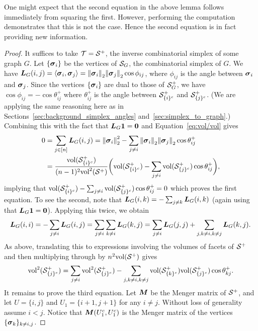 \begin{remark}
	One might expect that the second equation in the above lemma follows immediately from squaring the first. However, performing the computation demonstrates that this is not the case. Hence the second equation is in  fact providing new information. 
\end{remark}
\begin{proof}
	It suffices to take $\mathcal{T}=\mathcal{S}^+$, the  inverse combinatorial simplex of some graph $G$.  Let $\{\vb*{\sigma}_i\}$ be the vertices of $\mathcal{S}_G$, the combinatorial simplex of $G$. 	
	We have $\vb*{L}_G(i,j)=\langle\vb*{\sigma}_i,\vb*{\sigma}_j\rangle = \norm{\vb*{\sigma}_i}_2\norm{\vb*{\sigma}_j}_2\cos\phi_{ij}$, where $\phi_{ij}$ is the angle between $\vb*{\sigma}_i$ and $\vb*{\sigma}_j$. Since the vertices $\{\vb*{\sigma}_i\}$ are  dual to those of $\mathcal{S}^+_G$, we have $\cos\phi_{ij}=-\cos\theta^+_{ij}$ where $\theta^+_{ij}$ is the angle between $\mathcal{S}^+_{\{i\}^c}$ and $\mathcal{S}^+_{\{j\}^c}$. (We are applying the same reasoning here as in Sections~\ref{sec:background_simplex_angles} and~\ref{sec:simplex_to_graph}.) Combining this with the fact that $\vb*{L}_G\vb{1}=\vb{0}$ and Equation~\eqref{eq:vol/vol} gives
	\begin{align*}
	0 &= \sum_{j\in[n]} \vb*{L}_G(i,j) = \norm{\vb*{\sigma}_i}_2^2 - \sum_{j\neq i}\norm{\vb*{\sigma}_i}_2\norm{\vb*{\sigma}_j}_2\cos\theta_{ij}^+ \\
	&= \frac{\textnormal{vol}(\mathcal{S}_{\{i\}^c}^+)}{(n-1)^2\textnormal{vol}^2(\mathcal{S}^+)} \bigg(\textnormal{vol}(\mathcal{S}^+_{\{i\}^c}) - \sum_{j\neq i}\textnormal{vol}(\mathcal{S}_{\{j\}^c}^+)\cos\theta_{ij}^+\bigg),
	\end{align*}
	implying that $\textnormal{vol}(\mathcal{S}^+_{\{i\}^c}) - \sum_{j\neq i}\textnormal{vol}(\mathcal{S}_{\{j\}^c}^+)\cos\theta_{ij}^+=0$ which proves the first equation. To see the second,  note that $\vb*{L}_G(i,k)=-\sum_{j\neq k}\vb*{L}_G(i,k)$  (again using that $\vb*{L}_G\vb{1}=\vb{0}$). Applying  this twice, we obtain 
	\[\vb*{L}_G(i,i) = -\sum_{j\neq i}\vb*{L}_G(i,j) = \sum_{j\neq i}\sum_{k\neq i}\vb*{L}_G(k,j) = \sum_{j\neq i}\vb*{L}_G(j,j) + \sum_{j,k\neq i,k\neq j}\vb*{L}_G(k,j).\] 
	As above,  translating this to expressions involving the volumes of facets of $\mathcal{S}^+$ and then multiplying through by $n^2\textnormal{vol}(\mathcal{S}^+)$ gives  
	\begin{equation*}
	\textnormal{vol}^2(\mathcal{S}_{\{j\}^c}^+) = \sum_{j\neq i}\textnormal{vol}^2(\mathcal{S}_{\{j\}^c}^+) - \sum_{j,k\neq i,k\neq j} \textnormal{vol}(\mathcal{S}_{\{k\}^c}^+)\textnormal{vol}(\mathcal{S}_{\{j\}^c}^+)\cos\theta_{kj}^+. 
	\end{equation*}
	It remains to  prove  the  third equation.  Let ${\vb*{M}}$ be  the Menger matrix of $\mathcal{S}^+$, and  let $U=\{i,j\}$  and  $U_1=\{i+1,j+1\}$ for any $i\neq j$. Without loss of generality assume  $i<j$. 
	Notice that ${\vb*{M}}(U_1^c,U_1^c)$ is the Menger matrix of the vertices $\{\vb*{\sigma}_k\}_{k\neq i,j}$. 

\end{proof}
